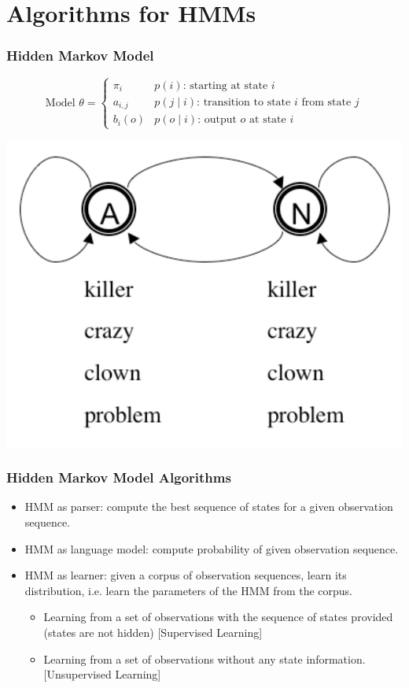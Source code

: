 \section{Algorithms for HMMs}

\begin{frame}
\frametitle{Hidden Markov Model}
\[
\textrm{Model $\theta$} = \left\{ 
\begin{array}{ll} 
\pi_i & \textrm{$p(i)$: starting at state $i$} \\ 
a_{i,j} & \textrm{$p(j \mid i)$: transition to state $i$ from state $j$} \\ 
b_i(o) & \textrm{$p( o \mid i)$: output $o$ at state $i$}
\end{array} 
\right.\]

\begin{center}
\includegraphics[scale=.4]{figures/hmmfig}
\end{center}
\end{frame}

\begin{frame}
\frametitle{Hidden Markov Model Algorithms}
\begin{itemize}
\item HMM as parser: compute the best sequence of states for a given observation sequence.
\item HMM as language model: compute probability of given observation sequence.
\item HMM as learner: given a corpus of observation sequences, learn its distribution, i.e. learn the parameters of the HMM from the corpus.
\begin{itemize}
\item Learning from a set of observations with the sequence of states provided (states are not hidden) {\color{blue} [Supervised Learning]}
\item Learning from a set of observations without any state information. {\color{blue} [Unsupervised Learning]}
\end{itemize}
\end{itemize}
\end{frame}

